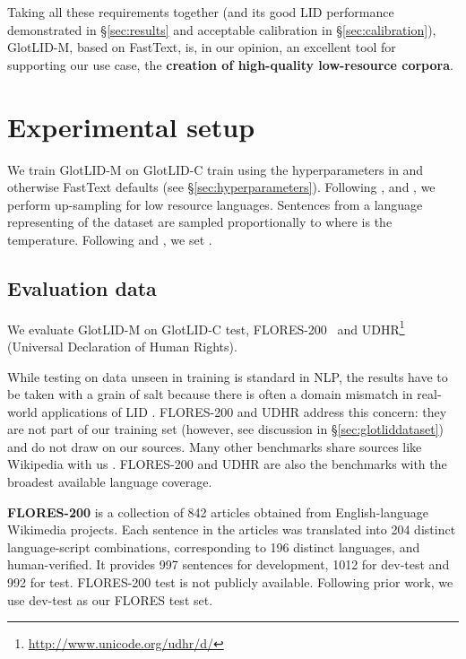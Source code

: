 \documentclass[11pt]{article}
\def\modelname{\mbox{GlotLID-M}\xspace}
\def\corpusname{\mbox{GlotLID-C}\xspace}
\def\flores{FLORES\xspace}
\def\udhr{UDHR\xspace}
\def\seclabel#1{\label{sec:#1}\label{p:#1}}
\def\secref#1{\S\ref{sec:#1}}
\begin{document}
Taking all these requirements together (and its good LID performance demonstrated in \secref{results} and acceptable calibration in \secref{calibration}), \modelname, based on FastText, is, in our opinion, an excellent tool for supporting our use case, the \textbf{creation of high-quality low-resource corpora}.


\section{Experimental setup}
We train \modelname on \corpusname train
using the hyperparameters
in \citep{nllbteam2022language, burchell-etal-2023-open} and
otherwise FastText defaults (see
\secref{hyperparameters}).
Following \citet{arivazhagan2019massively}, \citet{nllbteam2022language}
and \citet{burchell-etal-2023-open}, we perform up-sampling
for low resource languages.  Sentences from a language 
representing  of the dataset are sampled
proportionally to  where  is the
temperature.  Following \citet{nllbteam2022language}
and \citet{burchell-etal-2023-open}, we set
.




\subsection{Evaluation data}\seclabel{evaluation_data}

We evaluate \modelname on \corpusname test,
\flores-200~\cite{nllbteam2022language} and
\udhr\footnote{\url{http://www.unicode.org/udhr/d/}} (Universal
Declaration of Human Rights).

While testing on  data unseen in training is standard in NLP,
the results have to be taken with a grain of salt because there is often
a domain mismatch in real-world applications of LID
\citep{caswell-etal-2020-language, dunn2020mapping}.
\flores-200 and \udhr 
address this concern: they are not part of our training set
(however, see discussion in \secref{glotliddataset})
and do not draw on our sources. Many other
benchmarks share sources like Wikipedia with us
\citep{thoma2018wili, haas-derczynski-2021-discriminating,
ahmadi-etal-2023-pali}. 
\flores-200 and \udhr  are also the benchmarks
with the broadest available language coverage.


\textbf{\flores-200}
is a collection of 842 articles
obtained from English-language Wikimedia projects. Each
sentence in the articles was translated into 
204 distinct language-script combinations, corresponding to
196 distinct languages,
and
human-verified. It
provides 997 sentences for development, 1012  for
dev-test and 992 for  test. \flores-200 test is not
publicly available.
Following prior work,
we use
dev-test as our \flores test set.
\end{document}
